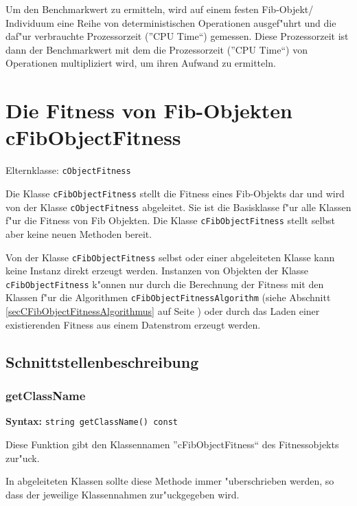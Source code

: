 Um den Benchmarkwert zu ermitteln, wird auf einem festen Fib-Objekt/ Individuum eine Reihe von deterministischen Operationen ausgef"uhrt und die daf"ur verbrauchte Prozessorzeit (''CPU Time``) gemessen. Diese Prozessorzeit ist dann der Benchmarkwert mit dem die Prozessorzeit (''CPU Time``) von Operationen multipliziert wird, um ihren Aufwand zu ermitteln.




\section{Die Fitness von Fib-Objekten cFibObjectFitness}
\label{secCFibObjectFitness}

Elternklasse: \verb|cObjectFitness|

\bigskip\noindent
Die Klasse \verb|cFibObjectFitness| stellt die Fitness eines Fib-Objekts dar und wird von der Klasse \verb|cObjectFitness| abgeleitet. Sie ist die Basisklasse f"ur alle Klassen f"ur die Fitness von Fib Objekten. Die Klasse \verb|cFibObjectFitness| stellt selbst aber keine neuen Methoden bereit.

Von der Klasse \verb|cFibObjectFitness| selbst oder einer abgeleiteten Klasse kann keine Instanz direkt erzeugt werden. Instanzen von Objekten der Klasse \verb|cFibObjectFitness| k"onnen nur durch die Berechnung der Fitness mit den Klassen f"ur die Algorithmen \verb|cFibObjectFitnessAlgorithm| (siehe Abschnitt \ref{secCFibObjectFitnessAlgorithmus} auf Seite \pageref{secCFibObjectFitnessAlgorithmus}) oder durch das Laden einer existierenden Fitness aus einem Datenstrom erzeugt werden.



\subsection{Schnittstellenbeschreibung}

\subsubsection{getClassName}

\textbf{Syntax:} \verb|string getClassName() const|

\bigskip\noindent
Diese Funktion gibt den Klassennamen ''cFibObjectFitness`` des Fitnessobjekts zur"uck.

In abgeleiteten Klassen sollte diese Methode immer "uberschrieben werden, so dass der jeweilige Klassennahmen zur"uckgegeben wird.

